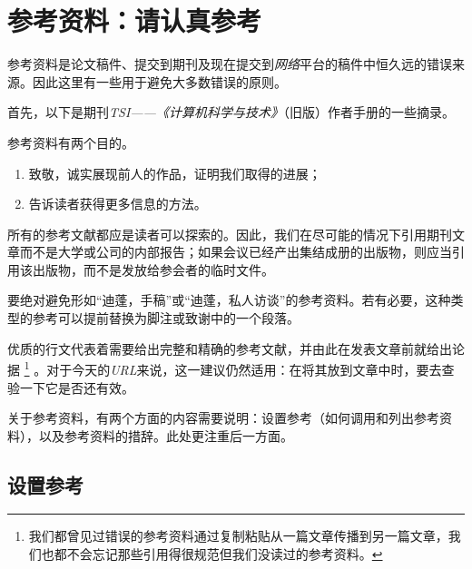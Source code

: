 \chapter{参考资料：请认真参考}

\label{chap6}

参考资料是论文稿件、提交到期刊及现在提交到\emph{网络}平台的稿件中恒久远的错误来源。因此这里有一些用于避免大多数错误的原则。

首先，以下是期刊\emph{TSI——《计算机科学与技术》}（旧版）作者手册的一些摘录。

\begin{mdframed}
    参考资料有两个目的。

    \begin{enumerate}
        \item 致敬，诚实展现前人的作品，证明我们取得的进展；
        \item 告诉读者获得更多信息的方法。
    \end{enumerate}

    所有的参考文献都应是读者可以探索的。因此，我们在尽可能的情况下引用期刊文章而不是大学或公司的内部报告；如果会议已经产出集结成册的出版物，则应当引用该出版物，而不是发放给参会者的临时文件。

    要绝对避免形如“迪蓬，手稿”或“迪蓬，私人访谈”的参考资料。若有必要，这种类型的参考可以提前替换为脚注或致谢中的一个段落。
\end{mdframed}

优质的行文代表着需要给出完整和精确的参考文献，并由此在发表文章前就给出论据
    \footnote{我们都曾见过错误的参考资料通过复制粘贴从一篇文章传播到另一篇文章，我们也都不会忘记那些引用得很规范但我们没读过的参考资料。}
。对于今天的\emph{URL}来说，这一建议仍然适用：在将其放到文章中时，要去查验一下它是否还有效。

关于参考资料，有两个方面的内容需要说明：设置参考（如何调用和列出参考资料），以及参考资料的措辞。此处更注重后一方面。

\section{设置参考}

